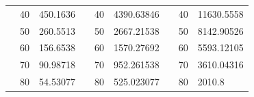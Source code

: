 \begin{table}[]
\begin{tabular}{|cclcclccl|}
\rowcolor[HTML]{DDFDFF} 
\multicolumn{1}{|c|}{\cellcolor[HTML]{FFFFC7}}                       & \multicolumn{1}{c|}{\cellcolor[HTML]{DDFDFF}40}        & \multicolumn{1}{l|}{\cellcolor[HTML]{DDFDFF}450.1636}   & \multicolumn{1}{c|}{\cellcolor[HTML]{FFFFC7}}                       & \multicolumn{1}{c|}{\cellcolor[HTML]{DDFDFF}40}        & \multicolumn{1}{l|}{\cellcolor[HTML]{DDFDFF}4390.63846} & \multicolumn{1}{c|}{\cellcolor[HTML]{FFFFC7}}                       & \multicolumn{1}{c|}{\cellcolor[HTML]{DDFDFF}40}        & 11630.5558 \\ \cline{2-3} \cline{5-6} \cline{8-9} 
\rowcolor[HTML]{DAE8FC} 
\multicolumn{1}{|c|}{\cellcolor[HTML]{FFFFC7}}                       & \multicolumn{1}{c|}{\cellcolor[HTML]{DAE8FC}50}        & \multicolumn{1}{l|}{\cellcolor[HTML]{DAE8FC}260.5513}   & \multicolumn{1}{c|}{\cellcolor[HTML]{FFFFC7}}                       & \multicolumn{1}{c|}{\cellcolor[HTML]{DAE8FC}50}        & \multicolumn{1}{l|}{\cellcolor[HTML]{DAE8FC}2667.21538} & \multicolumn{1}{c|}{\cellcolor[HTML]{FFFFC7}}                       & \multicolumn{1}{c|}{\cellcolor[HTML]{DAE8FC}50}        & 8142.90526 \\ \cline{2-3} \cline{5-6} \cline{8-9} 
\rowcolor[HTML]{DDFDFF} 
\multicolumn{1}{|c|}{\cellcolor[HTML]{FFFFC7}}                       & \multicolumn{1}{c|}{\cellcolor[HTML]{DDFDFF}60}        & \multicolumn{1}{l|}{\cellcolor[HTML]{DDFDFF}156.6538}   & \multicolumn{1}{c|}{\cellcolor[HTML]{FFFFC7}}                       & \multicolumn{1}{c|}{\cellcolor[HTML]{DDFDFF}60}        & \multicolumn{1}{l|}{\cellcolor[HTML]{DDFDFF}1570.27692} & \multicolumn{1}{c|}{\cellcolor[HTML]{FFFFC7}}                       & \multicolumn{1}{c|}{\cellcolor[HTML]{DDFDFF}60}        & 5593.12105 \\ \cline{2-3} \cline{5-6} \cline{8-9} 
\rowcolor[HTML]{DAE8FC} 
\multicolumn{1}{|c|}{\cellcolor[HTML]{FFFFC7}}                       & \multicolumn{1}{c|}{\cellcolor[HTML]{DAE8FC}70}        & \multicolumn{1}{l|}{\cellcolor[HTML]{DAE8FC}90.98718}   & \multicolumn{1}{c|}{\cellcolor[HTML]{FFFFC7}}                       & \multicolumn{1}{c|}{\cellcolor[HTML]{DAE8FC}70}        & \multicolumn{1}{l|}{\cellcolor[HTML]{DAE8FC}952.261538} & \multicolumn{1}{c|}{\cellcolor[HTML]{FFFFC7}}                       & \multicolumn{1}{c|}{\cellcolor[HTML]{DAE8FC}70}        & 3610.04316 \\ \cline{2-3} \cline{5-6} \cline{8-9} 
\rowcolor[HTML]{DDFDFF} 
\multicolumn{1}{|c|}{\cellcolor[HTML]{FFFFC7}}                       & \multicolumn{1}{c|}{\cellcolor[HTML]{DDFDFF}80}        & \multicolumn{1}{l|}{\cellcolor[HTML]{DDFDFF}54.53077}   & \multicolumn{1}{c|}{\cellcolor[HTML]{FFFFC7}}                       & \multicolumn{1}{c|}{\cellcolor[HTML]{DDFDFF}80}        & \multicolumn{1}{l|}{\cellcolor[HTML]{DDFDFF}525.023077} & \multicolumn{1}{c|}{\cellcolor[HTML]{FFFFC7}}                       & \multicolumn{1}{c|}{\cellcolor[HTML]{DDFDFF}80}        & 2010.8     \\ \cline{2-3} \cline{5-6} \cline{8-9} 

\end{tabular}
\end{table}
